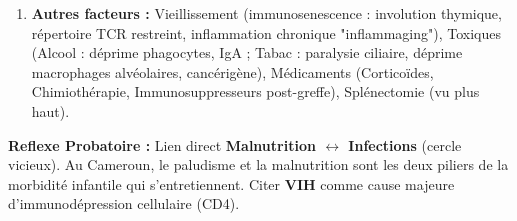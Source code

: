 \documentclass[11pt]{article}
\begin{document}
\begin{methode}
\begin{enumerate}
\begin{itemize}
            \item \textbf{VIH/Sida :} Destruction ciblée des \textbf{LT4/CD4+} (récepteur CD4 = co-récepteur viral). Effondrement de l'aide lymphocytaire $\rightarrow$ anergie LB, défaut activation LT8, défaut activation macrophages. Infections opportunistes (TB, Pneumocystose, Toxoplasmose, Cryptococcose, Candidose).
            \item \textbf{Paludisme grave / Sepsis :} "Paralysie immunitaire" transitoire (tolérance aux endotoxines, désexpression HLA-DR sur monocytes, apoptose lymphocytaire massive).
            \item \textbf{Rougeole :} Immunosuppression prolongée (mois/années) par "amnésie immunitaire" (perte lymphocytes mémoire préexistants).
        \end{itemize}
        \item \textbf{Autres facteurs :} Vieillissement (immunosenescence : involution thymique, répertoire TCR restreint, inflammation chronique "inflammaging"), Toxiques (Alcool : déprime phagocytes, IgA ; Tabac : paralysie ciliaire, déprime macrophages alvéolaires, cancérigène), Médicaments (Corticoïdes, Chimiothérapie, Immunosuppresseurs post-greffe), Splénectomie (vu plus haut).
    \end{enumerate}
    \textbf{Reflexe Probatoire :} Lien direct \textbf{Malnutrition $\leftrightarrow$ Infections} (cercle vicieux). Au Cameroun, le paludisme et la malnutrition sont les deux piliers de la morbidité infantile qui s'entretiennent. Citer \textbf{VIH} comme cause majeure d'immunodépression cellulaire (CD4).
\end{methode}
\end{document}
